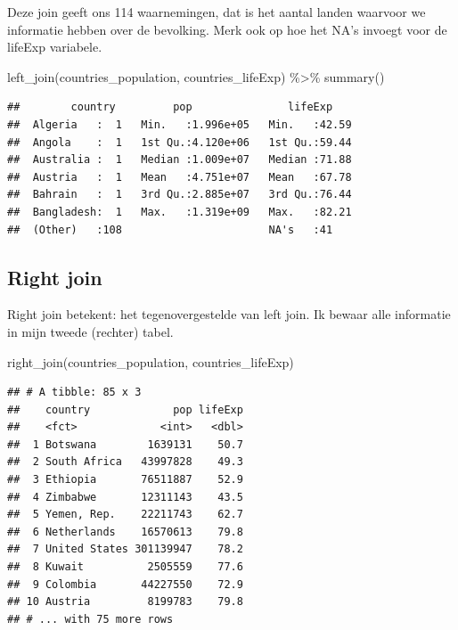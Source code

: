 \documentclass[]{tufte-book}
\newenvironment{Shaded}{}{}
\newcommand{\FunctionTok}[1]{\textcolor[rgb]{0.02,0.16,0.49}{#1}}
\newcommand{\NormalTok}[1]{#1}
\newcommand{\SpecialCharTok}[1]{\textcolor[rgb]{0.25,0.44,0.63}{#1}}
\begin{document}
Deze join geeft ons 114 waarnemingen, dat is het aantal landen waarvoor we informatie hebben over de bevolking. Merk ook op hoe het NA's invoegt voor de lifeExp variabele.

\begin{Shaded}
\begin{Highlighting}[]
\FunctionTok{left\_join}\NormalTok{(countries\_population, countries\_lifeExp) }\SpecialCharTok{\%\textgreater{}\%}
  \FunctionTok{summary}\NormalTok{()}
\end{Highlighting}
\end{Shaded}

\begin{verbatim}
##        country         pop               lifeExp     
##  Algeria   :  1   Min.   :1.996e+05   Min.   :42.59  
##  Angola    :  1   1st Qu.:4.120e+06   1st Qu.:59.44  
##  Australia :  1   Median :1.009e+07   Median :71.88  
##  Austria   :  1   Mean   :4.751e+07   Mean   :67.78  
##  Bahrain   :  1   3rd Qu.:2.885e+07   3rd Qu.:76.44  
##  Bangladesh:  1   Max.   :1.319e+09   Max.   :82.21  
##  (Other)   :108                       NA's   :41
\end{verbatim}

\hypertarget{right-join}{%
\subsection{Right join}\label{right-join}}

Right join betekent: het tegenovergestelde van left join. Ik bewaar alle informatie in mijn tweede (rechter) tabel.

\begin{Shaded}
\begin{Highlighting}[]
\FunctionTok{right\_join}\NormalTok{(countries\_population, countries\_lifeExp)}
\end{Highlighting}
\end{Shaded}

\begin{verbatim}
## # A tibble: 85 x 3
##    country             pop lifeExp
##    <fct>             <int>   <dbl>
##  1 Botswana        1639131    50.7
##  2 South Africa   43997828    49.3
##  3 Ethiopia       76511887    52.9
##  4 Zimbabwe       12311143    43.5
##  5 Yemen, Rep.    22211743    62.7
##  6 Netherlands    16570613    79.8
##  7 United States 301139947    78.2
##  8 Kuwait          2505559    77.6
##  9 Colombia       44227550    72.9
## 10 Austria         8199783    79.8
## # ... with 75 more rows
\end{verbatim}
\end{document}
